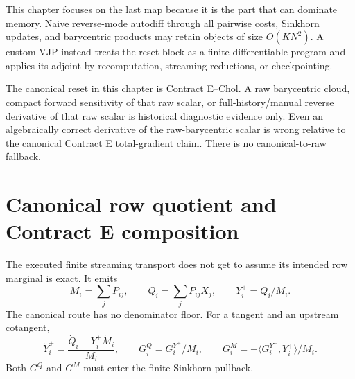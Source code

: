 This chapter focuses on the last map because it is the part that can dominate
memory.  Naive reverse-mode autodiff through all pairwise costs, Sinkhorn
updates, and barycentric products may retain objects of size \(O(KN^2)\).  A
custom VJP instead treats the reset block as a finite differentiable program and
applies its adjoint by recomputation, streaming reductions, or checkpointing.

The canonical reset in this chapter is Contract E--Chol.  A raw barycentric
cloud, compact forward sensitivity of that raw scalar, or full-history/manual
reverse derivative of that raw scalar is historical diagnostic evidence only.
Even an algebraically correct derivative of the raw-barycentric scalar is wrong
relative to the canonical Contract E total-gradient claim.  There is no
canonical-to-raw fallback.

\section{Canonical row quotient and Contract E composition}
\label{sec:bf-ledh-contract-e-total-composition}

The executed finite streaming transport does not get to assume its intended
row marginal is exact.  It emits
\begin{equation}
\label{eq:bf-ledh-contract-e-row-quotient}
  M_i=\sum_jP_{ij},\qquad
  Q_i=\sum_jP_{ij}X_j,\qquad
  Y_i^+=Q_i/M_i .
\end{equation}
The canonical route has no denominator floor.  For a tangent and an upstream
cotangent,
\begin{equation}
\label{eq:bf-ledh-contract-e-row-quotient-jvp-vjp}
  \dot Y_i^+=\frac{\dot Q_i-Y_i^+\dot M_i}{M_i},\qquad
  G_i^Q=G_i^{Y^+}/M_i,\qquad
  G_i^M=-\langle G_i^{Y^+},Y_i^+\rangle/M_i .
\end{equation}
Both \(G^Q\) and \(G^M\) must enter the finite Sinkhorn pullback.


